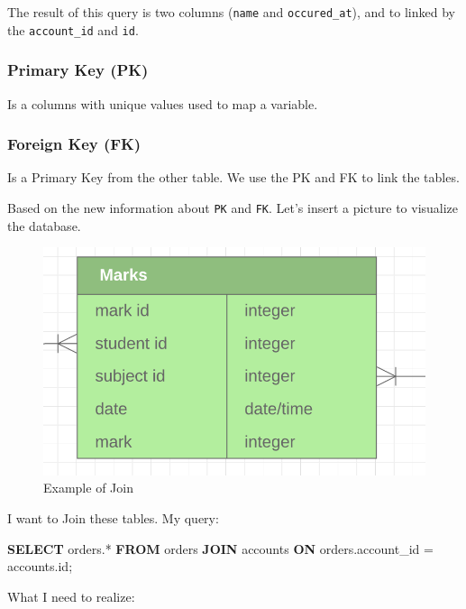 \documentclass[]{book}
\newenvironment{Shaded}{\begin{snugshade}}{\end{snugshade}}
\newcommand{\KeywordTok}[1]{\textcolor[rgb]{0.13,0.29,0.53}{\textbf{#1}}}
\newcommand{\NormalTok}[1]{#1}
\begin{document}
The result of this query is two columns (\texttt{name} and
\texttt{occured\_at}), and to linked by the \texttt{account\_id} and
\texttt{id}.

\subsubsection{Primary Key (PK)}\label{primary-key-pk}

Is a columns with unique values used to map a variable.

\subsubsection{Foreign Key (FK)}\label{foreign-key-fk}

Is a Primary Key from the other table. We use the PK and FK to link the
tables.

Based on the new information about \texttt{PK} and \texttt{FK}. Let's
insert a picture to visualize the database.

\begin{figure}
\centering
\includegraphics{01-img/1.png}
\caption{Example of Join}
\end{figure}

I want to Join these tables. My query:

\begin{Shaded}
\begin{Highlighting}[]
\KeywordTok{SELECT}\NormalTok{ orders.*}
\KeywordTok{FROM}\NormalTok{ orders}
\KeywordTok{JOIN}\NormalTok{ accounts}
\KeywordTok{ON}\NormalTok{ orders.account_id = accounts.id;}
\end{Highlighting}
\end{Shaded}

What I need to realize:
\end{document}
